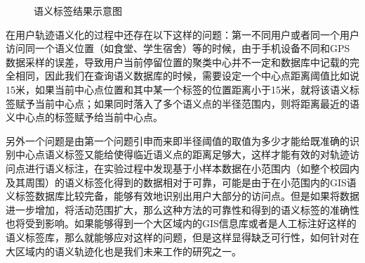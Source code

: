 \begin{figure}[htb]
  \centering%
  \hspace{4em}%
  \hspace{4em}%
  \caption{语义标签结果示意图}
  \label{fig:map_label}
\end{figure}
\par 在用户轨迹语义化的过程中还存在以下这样的问题：第一不同用户或者同一个用户访问同一个语义位置（如食堂、学生宿舍）等的时候，由于手机设备不同和GPS数据采样的误差，导致用户当前停留位置的聚类中心并不一定和数据库中记载的完全相同，因此我们在查询语义数据库的时候，需要设定一个中心点距离阈值比如说15米，如果当前中心点位置和其中某一个标签的位置距离小于15米，就将该语义标签赋予当前中心点；如果同时落入了多个语义点的半径范围内，则将距离最近的语义中心点的标签赋予给当前中心点。
\par 另外一个问题是由第一个问题引申而来即半径阈值的取值为多少才能给既准确的识别中心点语义标签又能给使得临近语义点的距离足够大，这样才能有效的对轨迹访问点进行语义标注，在实验过程中发现基于小样本数据在小范围内（如整个校园内及其周围）的语义标签化得到的数据相对于可靠，可能是由于在小范围内的GIS语义标签数据库比较完备，能够有效地识别出用户大部分的访问点。但是如果将数据进一步增加，将活动范围扩大，那么这种方法的可靠性和得到的语义标签的准确性也将受到影响。如果能够得到一个大区域内的GIS信息库或者是人工标注好这样的语义标签库，那么就能够应对这样的问题，但是这样显得缺乏可行性，如何针对在大区域内的语义轨迹化也是我们未来工作的研究之一。
